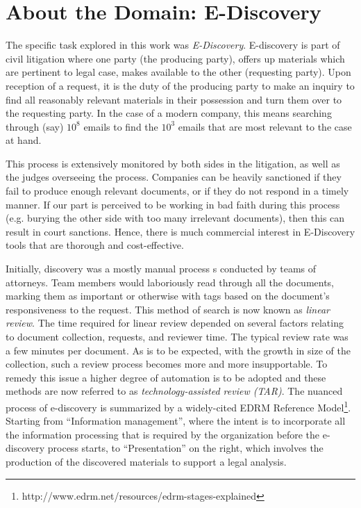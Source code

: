 \documentclass{sig-alternate-05-2015}
\begin{document}
\section{About the Domain: E-Discovery}

The specific  task explored in this work was {\em E-Discovery}.
  E-discovery is part of  civil litigation where one party (the producing party), offers up   materials which are pertinent to legal case, makes available to the other (requesting party).
  Upon reception of a request, it is the duty of the producing party to make an inquiry to find all reasonably relevant materials in their possession and turn them over to the requesting party.
  In the case of a modern company, this means searching through (say)
  $10^8$ emails to find the $10^3$ emails that are most relevant to the case at hand.
  
This process is extensively monitored by both sides in the litigation,
as well as the judges overseeing the process. Companies can be heavily sanctioned if
they fail to produce enough relevant documents, or if they do not respond in a timely
manner. If our part is perceived to be working in bad faith during this process
(e.g. burying the other side with too many irrelevant documents), then this
can result in court sanctions. Hence, there is much commercial interest in 
E-Discovery tools that are thorough and cost-effective.

Initially, discovery was a mostly manual process s conducted by teams of attorneys. 
Team members would laboriously read through all the documents, marking them as important or otherwise with tags based on the document's responsiveness to the request. This method of search is now known as \textit{linear review}. 
The time required for linear  review depended on several factors relating to document
collection, requests, and reviewer time. The typical review rate was a few minutes per document. As is to be expected, with the growth in size of the collection, such a review process becomes more and more insupportable. To remedy this issue a higher degree of automation is to be adopted and these methods are now referred to as \textit{technology-assisted review (TAR)}.
%
The  nuanced process of e-discovery is summarized  by a widely-cited   EDRM Reference Model\footnote{http://www.edrm.net/resources/edrm-stages-explained}.  Starting from ``Information management'', where the intent is to incorporate all the information processing that is required by the organization before the e-discovery process starts, to ``Presentation'' on the right, which involves the production of the discovered materials to support a legal analysis. 
\end{document}
